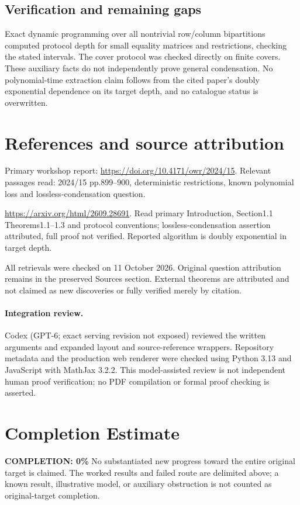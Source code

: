\documentclass[11pt]{article}
\begin{document}
\subsection{Verification and remaining gaps}
Exact dynamic programming over all nontrivial row/column bipartitions computed protocol depth for small equality matrices and restrictions, checking the stated intervals. The cover protocol was checked directly on finite covers. These auxiliary facts do not independently prove general condensation. No polynomial-time extraction claim follows from the cited paper's doubly exponential dependence on its target depth, and no catalogue status is overwritten.

\section{References and source attribution}
Primary workshop report: \url{https://doi.org/10.4171/owr/2024/15}. Relevant passages read: 2024/15 pp.899--900, deterministic restrictions, known polynomial loss and lossless-condensation question.

\url{https://arxiv.org/html/2609.28691}. Read primary Introduction, Section1.1 Theorems1.1--1.3 and protocol conventions; lossless-condensation assertion attributed, full proof not verified. Reported algorithm is doubly exponential in target depth.

All retrievals were checked on 11 October 2026. Original question attribution remains in the preserved Sources section. External theorems are attributed and not claimed as new discoveries or fully verified merely by citation.


\paragraph{Integration review.} Codex (GPT-6; exact serving revision not exposed) reviewed the written arguments and expanded layout and source-reference wrappers. Repository metadata and the production web renderer were checked using Python 3.13 and JavaScript with MathJax 3.2.2. This model-assisted review is not independent human proof verification; no PDF compilation or formal proof checking is asserted.

\section{Completion Estimate}
\noindent\textbf{COMPLETION: 0\%}
No substantiated new progress toward the entire original target is claimed. The worked results and failed route are delimited above; a known result, illustrative model, or auxiliary obstruction is not counted as original-target completion.
\end{document}
